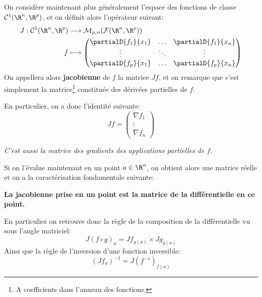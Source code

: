 \subsection*{}
On considère maintenant plus généralement l'espace des fonctions de classe \(\mathcal{C}^1(\R^n, \R^p)\), et on définit alors l'opérateur suivant:
\[
   \begin{aligned}
      J : \mathcal{C}^1(\R^n, \R^p) &\longrightarrow \mathcal{M}_{p, n}(\mathcal{F}(\R^n, \R^p))\\
      f &\longmapsto \begin{pmatrix}
         \partialD{f_1}{x_1} &\ldots &\partialD{f_1}{x_n}\\
         \vdots &\ddots &\vdots \\ 
         \partialD{f_p}{x_1} &\ldots &\partialD{f_p}{x_n}
      \end{pmatrix}
   \end{aligned}
\]
On appellera alors \textbf{jacobienne} de \(f\) la matrice \(Jf\), et on remarque que c'est simplement la matrice\footnote[1]{A coefficients dans l'anneau des fonctions.} constituée des dérivées partielles de \(f\).\<

En particulier, on a donc l'identité suivante:
\[
   Jf = \begin{pmatrix}
      \nabla f_1\\
      \vdots\\ 
      \nabla f_n
   \end{pmatrix}
\]
\begin{center}
   \textit{C'est aussi la matrice des gradients des applications partielles de \(f\).}
\end{center}
Si on l'évalue maintenant en un point \(a \in \R^n\), on obtient alors une matrice réelle et on a la caractérisation fondamentale suivante:
\begin{center}
   \textbf{La jacobienne prise en un point est la matrice de la différentielle en ce point.}
\end{center}
En particulier on retrouve donc la règle de la composition de la différentielle vu sous l'angle matriciel:
\[
   J(f \circ g)_a = Jf_{g(a)} \times Jg_{g(a)}
\]
Ainsi que la règle de l'inversion d'une fonction inversible:
\[
   (Jf_{a})^{-1} = J(f^{-1})_{f(a)}
\]
